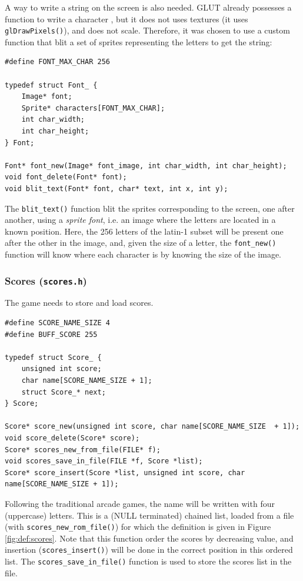 \documentclass[12pt,a4paper]{article}
\newcommand{\cc}[1]{\texttt{#1}}
\begin{document}
A way to write a string on the screen is also needed. GLUT already possesses a function to write a character \cite{glutrefchar}, but it does not uses textures (it uses \cc{glDrawPixels()}), and does not scale. Therefore, it was chosen to use a custom function that blit a set of sprites representing the letters to get the string:
\begin{verbatim}
#define FONT_MAX_CHAR 256

typedef struct Font_ {
	Image* font;
	Sprite* characters[FONT_MAX_CHAR];
    int char_width;
    int char_height;
} Font;

Font* font_new(Image* font_image, int char_width, int char_height);
void font_delete(Font* font);
void blit_text(Font* font, char* text, int x, int y);
\end{verbatim}
The \cc{blit_text()} function blit the sprites corresponding to the screen, one after another, using a \textit{sprite font}, i.e. an image where the letters are located in a known position. Here, the 256 letters of the latin-1 subset will be present one after the other in the image, and, given the size of a letter, the \cc{font_new()} function will know where each character is by knowing the size of the image.

\subsubsection{Scores (\texttt{scores.h})}

The game needs to store and load scores.

\begin{verbatim}
#define SCORE_NAME_SIZE 4
#define BUFF_SCORE 255

typedef struct Score_ {
    unsigned int score;
    char name[SCORE_NAME_SIZE + 1];
    struct Score_* next;
} Score;

Score* score_new(unsigned int score, char name[SCORE_NAME_SIZE  + 1]);
void score_delete(Score* score);
Score* scores_new_from_file(FILE* f);
void scores_save_in_file(FILE *f, Score *list);
Score* score_insert(Score *list, unsigned int score, char name[SCORE_NAME_SIZE + 1]);
\end{verbatim}

Following the traditional arcade games, the name will be written with four (uppercase) letters. This is a (NULL terminated) chained list, loaded from a file (with \cc{scores_new_rom_file()}) for which the definition is given in Figure \ref{fig:def:scores}. Note that this function order the scores by decreasing value, and insertion (\cc{scores_insert()}) will be done in the correct position in this ordered list. The \cc{scores_save_in_file()} function is used to store the scores list in the file.
\end{document}
